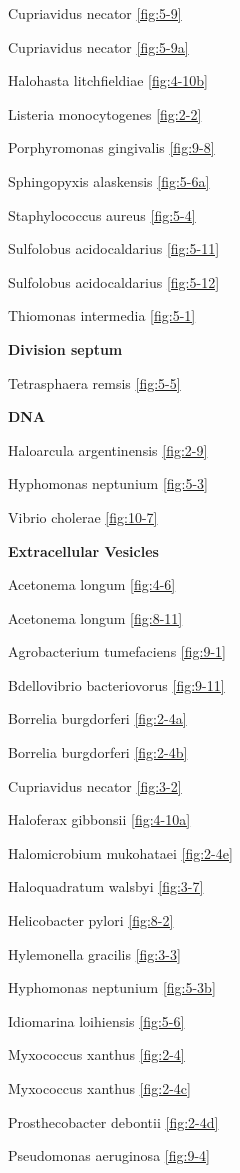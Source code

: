 \documentclass[]{tufte-book}
\begin{document}
Cupriavidus necator \ref{fig:5-9}

Cupriavidus necator \ref{fig:5-9a}

Halohasta litchfieldiae \ref{fig:4-10b}

Listeria monocytogenes \ref{fig:2-2}

Porphyromonas gingivalis \ref{fig:9-8}

Sphingopyxis alaskensis \ref{fig:5-6a}

Staphylococcus aureus \ref{fig:5-4}

Sulfolobus acidocaldarius \ref{fig:5-11}

Sulfolobus acidocaldarius \ref{fig:5-12}

Thiomonas intermedia \ref{fig:5-1}

\textbf{Division septum}

Tetrasphaera remsis \ref{fig:5-5}

\textbf{DNA}

Haloarcula argentinensis \ref{fig:2-9}

Hyphomonas neptunium \ref{fig:5-3}

Vibrio cholerae \ref{fig:10-7}

\textbf{Extracellular Vesicles}

Acetonema longum \ref{fig:4-6}

Acetonema longum \ref{fig:8-11}

Agrobacterium tumefaciens \ref{fig:9-1}

Bdellovibrio bacteriovorus \ref{fig:9-11}

Borrelia burgdorferi \ref{fig:2-4a}

Borrelia burgdorferi \ref{fig:2-4b}

Cupriavidus necator \ref{fig:3-2}

Haloferax gibbonsii \ref{fig:4-10a}

Halomicrobium mukohataei \ref{fig:2-4e}

Haloquadratum walsbyi \ref{fig:3-7}

Helicobacter pylori \ref{fig:8-2}

Hylemonella gracilis \ref{fig:3-3}

Hyphomonas neptunium \ref{fig:5-3b}

Idiomarina loihiensis \ref{fig:5-6}

Myxococcus xanthus \ref{fig:2-4}

Myxococcus xanthus \ref{fig:2-4c}

Prosthecobacter debontii \ref{fig:2-4d}

Pseudomonas aeruginosa \ref{fig:9-4}
\end{document}
